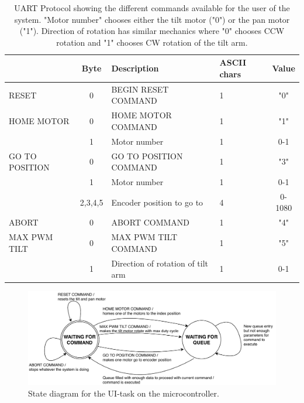 \documentclass[../../main.tex]{subfiles}
\begin{document}
\begin{table}[H]
    \centering
    
    \begin{tabular}{l|c|l|p{}|c} %
              & Byte & Description & ASCII chars & Value  \\
        \hline
        RESET & 0 & BEGIN RESET COMMAND & 1 & "0" \\
        \hline
        HOME MOTOR  & 0 & HOME MOTOR COMMAND & 1 & "1" \\
                    & 1 & Motor number & 1 & 0-1 \\
        \hline
        GO TO POSITION & 0 & GO TO POSITION COMMAND & 1 & "3" \\
            & 1 & Motor number & 1 & 0-1 \\
            & 2,3,4,5 & Encoder position to go to & 4 & 0-1080 \\
        \hline
        ABORT & 0 & ABORT COMMAND & 1 & "4" \\
        \hline
        MAX PWM TILT & 0 & MAX PWM TILT COMMAND & 1 & "5" \\
       & 1 & Direction of rotation of tilt arm & 1 & 0-1
    \end{tabular}    
    
    \caption{UART Protocol showing the different commands available for the user of the system. "Motor number" chooses either the tilt motor ("0") or the pan motor ("1"). Direction of rotation has similar mechanics where "0" chooses CCW rotation and "1" chooses CW rotation of the tilt arm.}
    \label{tab:UART_UI_PROTOCOL}
\end{table}

\begin{figure}[H]
    \centering
    \includegraphics[width=\textwidth]{Sections/System_Implementation/Images/UITaskStateDiagram.pdf}
    \caption{State diagram for the UI-task on the microcontroller.}
    \label{fig:UITaskStateDiagram}
\end{figure}
\end{document}
